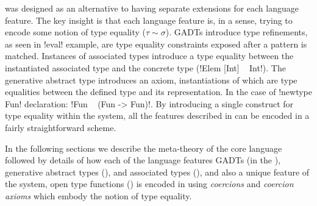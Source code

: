 \documentclass[screen,nonacm,manuscript,review]{acmart} %
\begin{document}
\SFC\cite{sulzmann_system_2007}
was designed as an alternative to having separate extensions for
each language feature. The key insight is that each language feature
is, in a sense, trying to encode some notion of type equality
($\tau\sim\sigma$). GADTs introduce type refinements, as seen in
!eval! example, are type equality constraints exposed after a pattern
is matched. Instances of associated types introduce a type equality
between the instantiated associated type and the concrete type
(!Elem [Int] ~ Int!). The generative abstract type introduces an axiom,
instantiations of which are type equalities between the defined type
and its representation. In the case of !newtype Fun! declaration:
!Fun ~ (Fun -> Fun)!. By introducing a single construct for type equality
within the system, all the features described in
 can be encoded in a fairly
straightforward scheme.

In the following sections we describe the meta-theory of the core
language followed by details of how each of the language features
GADTs (in the ), generative abstract
types (), and associated
types (), and also a unique feature of
the system, open type functions () is
encoded in \SFC using \emph{coercions} and \emph{coercion
  axioms} which embody the notion of type equality.








\end{document}
